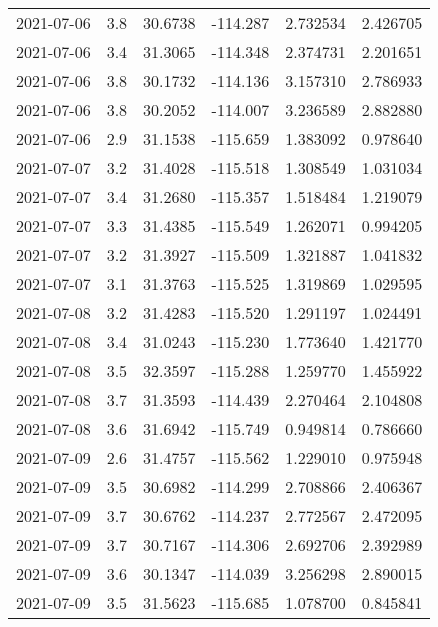 \begin{tabular}{lrrrrr}
2021-07-06 &       3.8 &  30.6738 &  -114.287 &         2.732534 &         2.426705 \\
2021-07-06 &       3.4 &  31.3065 &  -114.348 &         2.374731 &         2.201651 \\
2021-07-06 &       3.8 &  30.1732 &  -114.136 &         3.157310 &         2.786933 \\
2021-07-06 &       3.8 &  30.2052 &  -114.007 &         3.236589 &         2.882880 \\
2021-07-06 &       2.9 &  31.1538 &  -115.659 &         1.383092 &         0.978640 \\
2021-07-07 &       3.2 &  31.4028 &  -115.518 &         1.308549 &         1.031034 \\
2021-07-07 &       3.4 &  31.2680 &  -115.357 &         1.518484 &         1.219079 \\
2021-07-07 &       3.3 &  31.4385 &  -115.549 &         1.262071 &         0.994205 \\
2021-07-07 &       3.2 &  31.3927 &  -115.509 &         1.321887 &         1.041832 \\
2021-07-07 &       3.1 &  31.3763 &  -115.525 &         1.319869 &         1.029595 \\
2021-07-08 &       3.2 &  31.4283 &  -115.520 &         1.291197 &         1.024491 \\
2021-07-08 &       3.4 &  31.0243 &  -115.230 &         1.773640 &         1.421770 \\
2021-07-08 &       3.5 &  32.3597 &  -115.288 &         1.259770 &         1.455922 \\
2021-07-08 &       3.7 &  31.3593 &  -114.439 &         2.270464 &         2.104808 \\
2021-07-08 &       3.6 &  31.6942 &  -115.749 &         0.949814 &         0.786660 \\
2021-07-09 &       2.6 &  31.4757 &  -115.562 &         1.229010 &         0.975948 \\
2021-07-09 &       3.5 &  30.6982 &  -114.299 &         2.708866 &         2.406367 \\
2021-07-09 &       3.7 &  30.6762 &  -114.237 &         2.772567 &         2.472095 \\
2021-07-09 &       3.7 &  30.7167 &  -114.306 &         2.692706 &         2.392989 \\
2021-07-09 &       3.6 &  30.1347 &  -114.039 &         3.256298 &         2.890015 \\
2021-07-09 &       3.5 &  31.5623 &  -115.685 &         1.078700 &         0.845841 \\

\end{tabular}
